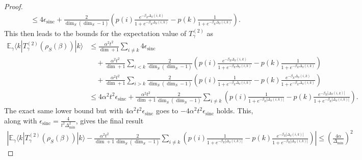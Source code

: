 \documentclass{article}
\newcommand{\ket}[1]{|#1\rangle}
\newcommand{\bra}[1]{\langle #1|}
\newcommand{\parens}[1]{\left( #1 \right)}
\newcommand{\abs}[1]{\left| #1 \right|}
\DeclareMathOperator{\sinc}{sinc}
\begin{document}
\begin{proof}
\begin{align}
        &\leq 4 \epsilon_{\sinc} + \frac{2}{\dim_S (\dim_S - 1)} \parens{p(i) \frac{e^{-\beta_E \Delta_S(i,k)}}{1 + e^{-\beta_E \Delta_S(i,k)}} - p(k) \frac{1}{1 + e^{-\beta_E \Delta_S(i,k)}}}.
    \end{align}
    This then leads to the bounds for the expectation value of $T_{\gamma}^{(2)}$ as 
    \begin{align}
        \mathbb{E}_{\gamma} \bra{k} T_{\gamma}^{(2)}(\rho_S(\beta)) \ket{k} &\leq \frac{\alpha^2 t^2}{\dim + 1} \sum_{i \neq k} 4 \epsilon_{\sinc} \nonumber \\
        &\quad + \frac{\alpha^2 t^2}{\dim + 1} \sum_{i < k} \frac{2}{\dim_S (\dim_S - 1)} \parens{p(i) \frac{e^{-\beta_E \Delta_S(i,k)}}{1 + e^{-\beta_E \Delta_S(i,k)}} - p(k) \frac{1}{1 + e^{-\beta_E \Delta_S(i,k)}}} \nonumber \\
        &\quad + \frac{\alpha^2 t^2}{\dim + 1} \sum_{i > k} \frac{2}{\dim_S (\dim_S - 1)} \parens{p(i) \frac{1}{1 + e^{-\beta_E \Delta_S(i,k)}} - p(k) \frac{e^{-\beta_E \Delta_S(i,k)}}{1 + e^{-\beta_E \Delta_S(i,k)}} } \\
        &\leq 4 \alpha^2 t^2 \epsilon_{\sinc} + \frac{\alpha^2 t^2}{\dim + 1} \frac{2}{\dim_S (\dim_S - 1)} \sum_{i \neq k} \parens{ p(i) \frac{1}{1 + e^{-\beta_E |\Delta_S(i,k)|}}  - p(k) \frac{e^{-\beta_E |\Delta_S(i,k)|}}{1 + e^{-\beta_E |\Delta_S(i,k)|}} }.
    \end{align}
    The exact same lower bound but with $4 \alpha^2 t^2 \epsilon_{\sinc}$ goes to $-4\alpha^2 t^2 \epsilon_{\sinc}$ holds. This, along with $\epsilon_{\sinc} = \frac{4}{t^2 \Delta_{\min}^2}$, gives the final result
    \begin{align}
        \abs{\mathbb{E}_{\gamma} \bra{k} T_{\gamma}^{(2)}(\rho_S(\beta)) \ket{k} - \frac{\alpha^2 t^2}{\dim + 1} \frac{2}{\dim_S (\dim_S - 1)} \sum_{i \neq k} \parens{ p(i) \frac{1}{1 + e^{-\beta_E |\Delta_S(i,k)|}}  - p(k) \frac{e^{-\beta_E |\Delta_S(i,k)|}}{1 + e^{-\beta_E |\Delta_S(i,k)|}} }} \leq  \parens{\frac{4 \alpha}{\Delta_{\min}}}^2
    \end{align}
\end{proof}
\end{document}

